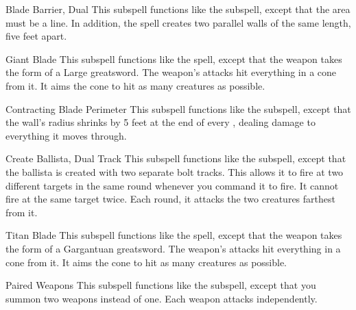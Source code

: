 \begin{ability}[\nth{4}]{Blade Barrier, Dual}
This subspell functions like the  subspell, except that the area must be a line.
In addition, the spell creates two parallel walls of the same length, five feet apart.
\end{ability}
\vspace{0.25em}


\begin{ability}[\nth{4}]{Giant Blade}
This subspell functions like the  spell, except that the weapon takes the form of a Large greatsword.
The weapon's attacks hit everything in a \areasmall cone from it.
It aims the cone to hit as many creatures as possible.
\end{ability}
\vspace{0.25em}


\begin{ability}[\nth{5}]{Contracting Blade Perimeter}
This subspell functions like the  subspell, except that the wall's radius shrinks by 5 feet at the end of every , dealing damage to everything it moves through.
\end{ability}
\vspace{0.25em}


\begin{ability}[\nth{6}]{Create Ballista, Dual Track}
This subspell functions like the  subspell, except that the ballista is created with two separate bolt tracks.
This allows it to fire at two different targets in the same round whenever you command it to fire.
It cannot fire at the same target twice.
Each round, it attacks the two creatures farthest from it.
\end{ability}
\vspace{0.25em}


\begin{ability}[\nth{8}]{Titan Blade}
This subspell functions like the  spell, except that the weapon takes the form of a Gargantuan greatsword.
The weapon's attacks hit everything in a \areamed cone from it.
It aims the cone to hit as many creatures as possible.
\end{ability}
\vspace{0.25em}


\begin{ability}[\nth{9}]{Paired Weapons}
This subspell functions like the  subspell, except that you summon two weapons instead of one.
Each weapon attacks independently.
\end{ability}
\vspace{0.25em}
